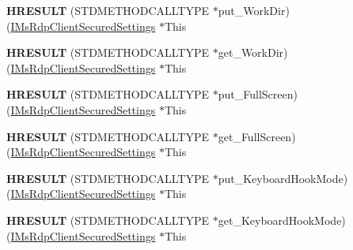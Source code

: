 \begin{DoxyCompactItemize}
{\bfseries H\+R\+E\+S\+U\+LT} (S\+T\+D\+M\+E\+T\+H\+O\+D\+C\+A\+L\+L\+T\+Y\+PE $\ast$put\+\_\+\+Work\+Dir)(\hyperlink{interface_m_s_t_s_c_lib_1_1_i_ms_rdp_client_secured_settings}{I\+Ms\+Rdp\+Client\+Secured\+Settings} $\ast$This
\item 
\mbox{\label{struct_m_s_t_s_c_lib_1_1_i_ms_rdp_client_secured_settings_vtbl_a73d63c262c48bbe680483cbdaa083560}} 
{\bfseries H\+R\+E\+S\+U\+LT} (S\+T\+D\+M\+E\+T\+H\+O\+D\+C\+A\+L\+L\+T\+Y\+PE $\ast$get\+\_\+\+Work\+Dir)(\hyperlink{interface_m_s_t_s_c_lib_1_1_i_ms_rdp_client_secured_settings}{I\+Ms\+Rdp\+Client\+Secured\+Settings} $\ast$This
\item 
\mbox{\label{struct_m_s_t_s_c_lib_1_1_i_ms_rdp_client_secured_settings_vtbl_a5a5d395fcad63b6c1613a6d7b45ff265}} 
{\bfseries H\+R\+E\+S\+U\+LT} (S\+T\+D\+M\+E\+T\+H\+O\+D\+C\+A\+L\+L\+T\+Y\+PE $\ast$put\+\_\+\+Full\+Screen)(\hyperlink{interface_m_s_t_s_c_lib_1_1_i_ms_rdp_client_secured_settings}{I\+Ms\+Rdp\+Client\+Secured\+Settings} $\ast$This
\item 
\mbox{\label{struct_m_s_t_s_c_lib_1_1_i_ms_rdp_client_secured_settings_vtbl_ab8e0692e2a5efbed6f17d807430bb98f}} 
{\bfseries H\+R\+E\+S\+U\+LT} (S\+T\+D\+M\+E\+T\+H\+O\+D\+C\+A\+L\+L\+T\+Y\+PE $\ast$get\+\_\+\+Full\+Screen)(\hyperlink{interface_m_s_t_s_c_lib_1_1_i_ms_rdp_client_secured_settings}{I\+Ms\+Rdp\+Client\+Secured\+Settings} $\ast$This
\item 
\mbox{\label{struct_m_s_t_s_c_lib_1_1_i_ms_rdp_client_secured_settings_vtbl_a9ccae5f386dfb92ea269d628eed5147b}} 
{\bfseries H\+R\+E\+S\+U\+LT} (S\+T\+D\+M\+E\+T\+H\+O\+D\+C\+A\+L\+L\+T\+Y\+PE $\ast$put\+\_\+\+Keyboard\+Hook\+Mode)(\hyperlink{interface_m_s_t_s_c_lib_1_1_i_ms_rdp_client_secured_settings}{I\+Ms\+Rdp\+Client\+Secured\+Settings} $\ast$This
\item 
\mbox{\label{struct_m_s_t_s_c_lib_1_1_i_ms_rdp_client_secured_settings_vtbl_a79351434cb6bb8bdfe7511a8e248e621}} 
{\bfseries H\+R\+E\+S\+U\+LT} (S\+T\+D\+M\+E\+T\+H\+O\+D\+C\+A\+L\+L\+T\+Y\+PE $\ast$get\+\_\+\+Keyboard\+Hook\+Mode)(\hyperlink{interface_m_s_t_s_c_lib_1_1_i_ms_rdp_client_secured_settings}{I\+Ms\+Rdp\+Client\+Secured\+Settings} $\ast$This

\end{DoxyCompactItemize}
